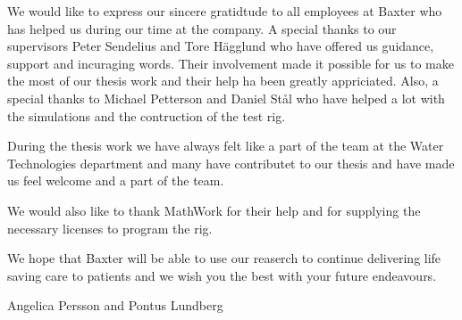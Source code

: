 We would like to express our sincere gratidtude to all employees at Baxter who has helped us during our time at the company. A special thanks to our supervisors Peter Sendelius and Tore Hägglund who have offered us guidance, support and incuraging words. Their involvement made it possible for us to make the most of our thesis work and their help ha been greatly appriciated. Also, a special thanks to Michael Petterson and Daniel Stål who have helped a lot with the simulations and the contruction of the test rig. 

During the  thesis work we have always felt like a part of the team at the Water Technologies department and many have contributet to our thesis and have made us feel welcome and a part of the team. 

We would also like to thank MathWork for their help and for supplying the necessary licenses to program the rig.

We hope that Baxter will be able to use our reaserch to continue delivering life saving care to patients and we wish you the best with your future endeavours.

Angelica Persson and Pontus Lundberg